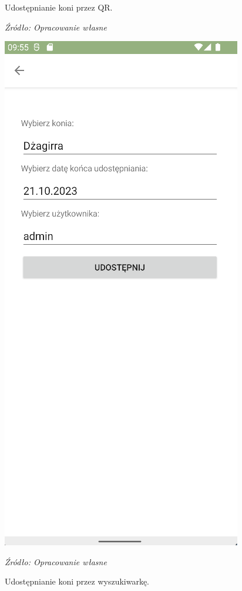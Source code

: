 \documentclass[12pt,oneside]{report}
\begin{document}
\begin{figure}[H]
\begin{center}
\begin{minipage}{5cm}
			\caption{\centering Udostępnianie koni przez QR.}
			\textit{Źródło: Opracowanie własne}
			\label{ShareQR}
		\end{minipage}
		\hfil
		\begin{minipage}{5cm}
			\centering
			\includegraphics[scale=0.6]{SharebySearch}
			\caption{\centering Udostępnianie koni przez wyszukiwarkę.}
			\textit{Źródło: Opracowanie własne}
			\label{ShareSearch}
		\end{minipage}
	\end{center}

\end{figure}
\end{document}
